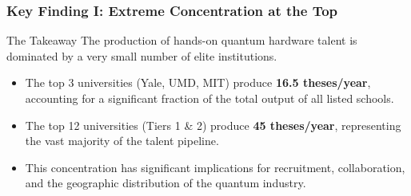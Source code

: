 \documentclass[aspectratio=169]{beamer}
\begin{document}
\begin{frame}
    \frametitle{Key Finding I: Extreme Concentration at the Top}
    
    \begin{alertblock}{The Takeaway}
        The production of hands-on quantum hardware talent is dominated by a very small number of elite institutions.
    \end{alertblock}
    
    \begin{itemize}
        \item The top 3 universities (Yale, UMD, MIT) produce \textbf{16.5 theses/year}, accounting for a significant fraction of the total output of all listed schools.
        \item The top 12 universities (Tiers 1 \& 2) produce \textbf{45 theses/year}, representing the vast majority of the talent pipeline.
        \item This concentration has significant implications for recruitment, collaboration, and the geographic distribution of the quantum industry.
    \end{itemize}
\end{frame}
\end{document}
